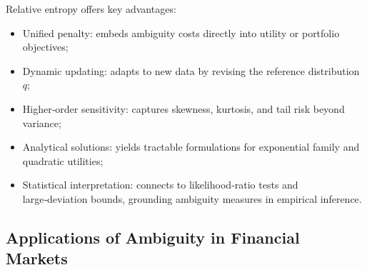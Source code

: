 \documentclass[preprint,12pt,authoryear]{elsarticle}
\begin{document}
Relative entropy offers key advantages:
\begin{itemize}
  \item Unified penalty: embeds ambiguity costs directly into utility or portfolio objectives;
  \item Dynamic updating: adapts to new data by revising the reference distribution $q$;
  \item Higher‑order sensitivity: captures skewness, kurtosis, and tail risk beyond variance;
  \item Analytical solutions: yields tractable formulations for exponential family and quadratic utilities;
  \item Statistical interpretation: connects to likelihood‑ratio tests and large‑deviation bounds, grounding ambiguity measures in empirical inference.
\end{itemize}


\subsection{Applications of Ambiguity in Financial Markets}
\end{document}
